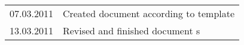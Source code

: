 \begin{table}[H]
		\begin{tabular}{| c | p{10cm} | }
    		\hline
			07.03.2011		&	Created document according to template		\\
			13.03.2011		&	Revised and finished document 			s	\\
			\hline
    	\end{tabular}
	\label{tab:changelog}
\end{table}